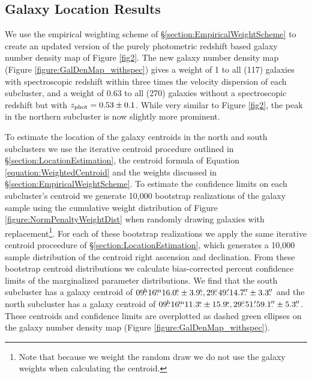 \subsection{Galaxy Location Results}

We use the empirical weighting scheme of \S\ref{section:EmpiricalWeightScheme} to create an updated version of the purely photometric redshift based galaxy number density map of Figure \ref{fig2}.
The new galaxy number density map (Figure \ref{figure:GalDenMap_withspec}) gives a weight of 1 to all (117) galaxies with spectroscopic redshift within three times the velocity dispersion of each subcluster, and a  weight of 0.63 to all (270) galaxies without a spectroscopic redshift but with $z_{\rm phot}=0.53\pm0.1$.
While very similar to Figure \ref{fig2}, the peak in the northern subcluster is now slightly more prominent.

To estimate the location of the galaxy centroids in the north and south subclusters we use the iterative centroid procedure outlined in \S\ref{section:LocationEstimation}, the centroid formula of Equation \ref{equation:WeightedCentroid} and the weights discussed in \S\ref{section:EmpiricalWeightScheme}.
To estimate the confidence limits on each subcluster's centroid we generate 10,000 bootstrap realizations of the galaxy sample using the cumulative weight distribution of Figure \ref{figure:NormPenaltyWeightDist} when randomly drawing galaxies with replacement\footnote{Note that because we weight the random draw we do not use the galaxy weights when calculating the centroid.}.
For each of these bootstrap realizations we apply the same iterative centroid proceedure of \S\ref{section:LocationEstimation}, which generates a 10,000 sample distribution of the centroid right ascension and declination.
From these bootstrap centroid distributions we calculate bias-corrected percent confidence limits \citep{Beers:1990kg} of the marginalized parameter distributions.
We find that the south subcluster has a galaxy centroid of $09\fh16\fm16.0\fs\pm3.9\fs, 29\fdg49\farcm14.7\farcs\pm3.3\farcs$ and the north subcluster has a galaxy centroid of $09\fh16\fm11.3\fs\pm15.9\fs, 29\fdg51\farcm59.1\farcs\pm5.3\farcs$.
These centroids and confidence limits are overplotted as dashed green ellipses on the galaxy number density map (Figure \ref{figure:GalDenMap_withspec}). 

